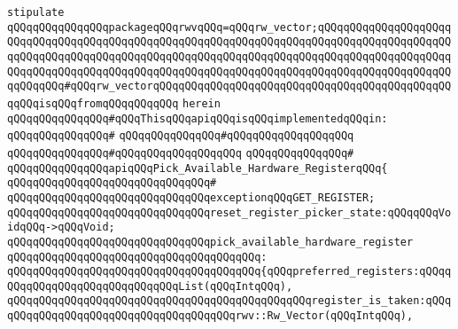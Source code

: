 \newline
\newline
\verb|stipulate|\newline
\verb|qQQqqQQqqQQqqQQqpackageqQQqrwvqQQq=qQQqrw_vector;qQQqqQQqqQQqqQQqqQQqqQQqqQQqqQQqqQQqqQQqqQQqqQQqqQQqqQQqqQQqqQQqqQQqqQQqqQQqqQQqqQQqqQQqqQQqqQQqqQQqqQQqqQQqqQQqqQQqqQQqqQQqqQQqqQQqqQQqqQQqqQQqqQQqqQQqqQQqqQQqqQQqqQQqqQQqqQQqqQQqqQQqqQQqqQQqqQQqqQQqqQQqqQQqqQQqqQQqqQQqqQQqqQQqqQQqqQQqqQQq#qQQqrw_vectorqQQqqQQqqQQqqQQqqQQqqQQqqQQqqQQqqQQqqQQqqQQqqQQqqQQqisqQQqfromqQQqqQQqqQQq|\newline
\verb|herein|\newline
\newline
\verb|qQQqqQQqqQQqqQQq#qQQqThisqQQqapiqQQqisqQQqimplementedqQQqin:|\newline
\verb|qQQqqQQqqQQqqQQq#|\newline
\verb|qQQqqQQqqQQqqQQq#qQQqqQQqqQQqqQQqqQQq|\newline
\verb|qQQqqQQqqQQqqQQq#qQQqqQQqqQQqqQQqqQQq|\newline
\verb|qQQqqQQqqQQqqQQq#|\newline
\verb|qQQqqQQqqQQqqQQqapiqQQqPick_Available_Hardware_RegisterqQQq{|\newline
\verb|qQQqqQQqqQQqqQQqqQQqqQQqqQQqqQQq#|\newline
\verb|qQQqqQQqqQQqqQQqqQQqqQQqqQQqqQQqexceptionqQQqGET_REGISTER;|\newline
\newline
\verb|qQQqqQQqqQQqqQQqqQQqqQQqqQQqqQQqreset_register_picker_state:qQQqqQQqVoidqQQq->qQQqVoid;|\newline
\newline
\verb|qQQqqQQqqQQqqQQqqQQqqQQqqQQqqQQqpick_available_hardware_register|\newline
\verb|qQQqqQQqqQQqqQQqqQQqqQQqqQQqqQQqqQQqqQQq:|\newline
\verb|qQQqqQQqqQQqqQQqqQQqqQQqqQQqqQQqqQQqqQQq{qQQqpreferred_registers:qQQqqQQqqQQqqQQqqQQqqQQqqQQqqQQqList(qQQqIntqQQq),|\newline
\verb|qQQqqQQqqQQqqQQqqQQqqQQqqQQqqQQqqQQqqQQqqQQqqQQqregister_is_taken:qQQqqQQqqQQqqQQqqQQqqQQqqQQqqQQqqQQqqQQqrwv::Rw_Vector(qQQqIntqQQq),|\newline
